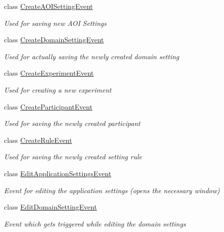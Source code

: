 \begin{DoxyCompactItemize}
class \hyperlink{class_web_analyzer_1_1_events_1_1_create_a_o_i_setting_event}{Create\+A\+O\+I\+Setting\+Event}
\begin{DoxyCompactList}\small\item\em Used for saving new A\+O\+I Settings \end{DoxyCompactList}\item 
class \hyperlink{class_web_analyzer_1_1_events_1_1_create_domain_setting_event}{Create\+Domain\+Setting\+Event}
\begin{DoxyCompactList}\small\item\em Used for actually saving the newly created domain setting \end{DoxyCompactList}\item 
class \hyperlink{class_web_analyzer_1_1_events_1_1_create_experiment_event}{Create\+Experiment\+Event}
\begin{DoxyCompactList}\small\item\em Used for creating a new experiment \end{DoxyCompactList}\item 
class \hyperlink{class_web_analyzer_1_1_events_1_1_create_participant_event}{Create\+Participant\+Event}
\begin{DoxyCompactList}\small\item\em Used for saving the newly created participant \end{DoxyCompactList}\item 
class \hyperlink{class_web_analyzer_1_1_events_1_1_create_rule_event}{Create\+Rule\+Event}
\begin{DoxyCompactList}\small\item\em Used for saving the newly created setting rule \end{DoxyCompactList}\item 
class \hyperlink{class_web_analyzer_1_1_events_1_1_edit_application_settings_event}{Edit\+Application\+Settings\+Event}
\begin{DoxyCompactList}\small\item\em Event for editing the application settings (opens the necessary window) \end{DoxyCompactList}\item 
class \hyperlink{class_web_analyzer_1_1_events_1_1_edit_domain_setting_event}{Edit\+Domain\+Setting\+Event}
\begin{DoxyCompactList}\small\item\em Event which gets triggered while editing the domain settings \end{DoxyCompactList}\item 

\end{DoxyCompactItemize}

